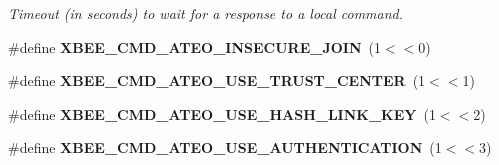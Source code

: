 \begin{DoxyCompactItemize}
\begin{DoxyCompactList}\small\item\em Timeout (in seconds) to wait for a response to a local command. \end{DoxyCompactList}\item 
\hypertarget{group__xbee__atcmd_gaa5d4a48819eeef79e9552c6c139b73cf}{\#define {\bfseries X\-B\-E\-E\-\_\-\-C\-M\-D\-\_\-\-A\-T\-E\-O\-\_\-\-I\-N\-S\-E\-C\-U\-R\-E\-\_\-\-J\-O\-I\-N}~(1$<$$<$0)}\label{group__xbee__atcmd_gaa5d4a48819eeef79e9552c6c139b73cf}

\item 
\hypertarget{group__xbee__atcmd_ga0aa3bb0ab5ac949a951778338d87356d}{\#define {\bfseries X\-B\-E\-E\-\_\-\-C\-M\-D\-\_\-\-A\-T\-E\-O\-\_\-\-U\-S\-E\-\_\-\-T\-R\-U\-S\-T\-\_\-\-C\-E\-N\-T\-E\-R}~(1$<$$<$1)}\label{group__xbee__atcmd_ga0aa3bb0ab5ac949a951778338d87356d}

\item 
\hypertarget{group__xbee__atcmd_ga203e29636f971bc1e5ca82d158eec447}{\#define {\bfseries X\-B\-E\-E\-\_\-\-C\-M\-D\-\_\-\-A\-T\-E\-O\-\_\-\-U\-S\-E\-\_\-\-H\-A\-S\-H\-\_\-\-L\-I\-N\-K\-\_\-\-K\-E\-Y}~(1$<$$<$2)}\label{group__xbee__atcmd_ga203e29636f971bc1e5ca82d158eec447}

\item 
\hypertarget{group__xbee__atcmd_ga11bd61fb70eddd0996b67c3b45bed8d3}{\#define {\bfseries X\-B\-E\-E\-\_\-\-C\-M\-D\-\_\-\-A\-T\-E\-O\-\_\-\-U\-S\-E\-\_\-\-A\-U\-T\-H\-E\-N\-T\-I\-C\-A\-T\-I\-O\-N}~(1$<$$<$3)}\label{group__xbee__atcmd_ga11bd61fb70eddd0996b67c3b45bed8d3}


\end{DoxyCompactItemize}
